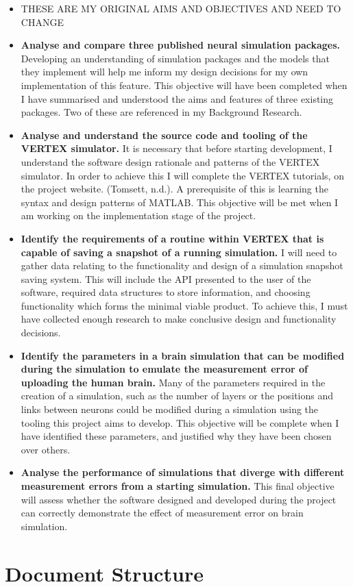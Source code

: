 \begin{itemize}
    \item THESE ARE MY ORIGINAL AIMS AND OBJECTIVES AND NEED TO CHANGE
    \item \textbf{Analyse and compare three published neural simulation packages.}
          Developing an understanding of simulation packages and the models that
          they implement will help me inform my design decisions for my own
          implementation of this feature. This objective will have been
          completed when I have summarised and understood the aims and features
          of three existing packages. Two of these are referenced in my
          Background Research.
    \item \textbf{Analyse and understand the source code and tooling of the
              VERTEX simulator.} It is necessary that before starting
          development, I understand the software design rationale and
          patterns of the VERTEX simulator. In order to achieve this I will
          complete the VERTEX tutorials, on the project website. (Tomsett,
          n.d.). A prerequisite of this is learning the syntax and design
          patterns of MATLAB. This objective will be met when I am working
          on the implementation stage of the project.
    \item \textbf{Identify the requirements of a routine within VERTEX that is
              capable of saving a snapshot of a running simulation.} I will need
          to gather data relating to the functionality and design of a
          simulation snapshot saving system. This will include the API
          presented to the user of the software, required data structures to
          store information, and choosing functionality which forms the
          minimal viable product. To achieve this, I must have collected
          enough research to make conclusive design and functionality
          decisions.
    \item \textbf{Identify the parameters in a brain simulation that can be
              modified during the simulation to emulate the measurement error of
              uploading the human brain.} Many of the parameters required in the
          creation of a simulation, such as the number of layers or the
          positions and links between neurons could be modified during a
          simulation using the tooling this project aims to develop. This
          objective will be complete when I have identified these
          parameters, and justified why they have been chosen over others.
    \item \textbf{Analyse the performance of simulations that diverge with
              different measurement errors from a starting simulation.} This
          final objective will assess whether the software designed and
          developed during the project can correctly demonstrate the effect
          of measurement error on brain simulation. 
\end{itemize}

\section{Document Structure}